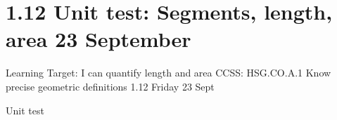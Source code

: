 \section{1.12 Unit test: Segments, length, area \hfill 23 September}
\begin{frame}{Learning Target: I can quantify length and area}
    {CCSS: HSG.CO.A.1 Know precise geometric definitions \hfill \alert{1.12 Friday 23 Sept}}

        \alert{Unit test}
    \end{frame} 
    
    
